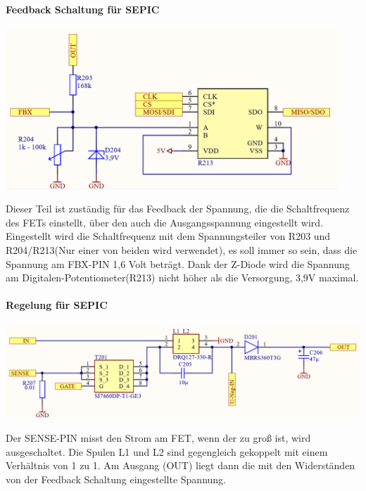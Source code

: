 \documentclass[paper=a4, 12pt]{scrreprt}
\begin{document}
			\paragraph{Feedback Schaltung für SEPIC}
			\begin{adjustbox}{center,caption={Feedback Schaltung für SEPIC},label={fig:feedback},nofloat=figure,vspace=\bigskipamount}
				\includegraphics[height=6cm]{img/Feedback_SEPIC.PNG}
			\end{adjustbox}
			Dieser Teil ist zuständig für das Feedback der Spannung, die die Schaltfrequenz des FETs einstellt, über den auch die Ausgangsspannung eingestellt wird. Eingestellt wird die Schaltfrequenz mit dem Spannungsteiler von R203 und R204/R213(Nur einer von beiden wird verwendet), es soll immer so sein, dass die Spannung am FBX-PIN 1,6 Volt beträgt. 
			Dank der Z-Diode wird die Spannung am Digitalen-Potentiometer(R213) nicht höher als die Versorgung, 3,9V maximal.
			\paragraph{Regelung für SEPIC}
			\begin{adjustbox}{center,caption={Regelungsschaltung für LT3757},label={fig:regelung},nofloat=figure,vspace=\bigskipamount}
				\includegraphics[width=\textwidth]{img/Regelung_SEPIC.PNG}
			\end{adjustbox}
			Der SENSE-PIN misst den Strom am FET, wenn der zu groß ist, wird ausgeschaltet. Die Spulen L1 und L2 sind gegengleich gekoppelt mit einem Verhältnis von 1 zu 1. Am Ausgang (OUT) liegt dann die mit den Widerständen von der Feedback Schaltung eingestellte Spannung.
			\pagebreak
\end{document}
